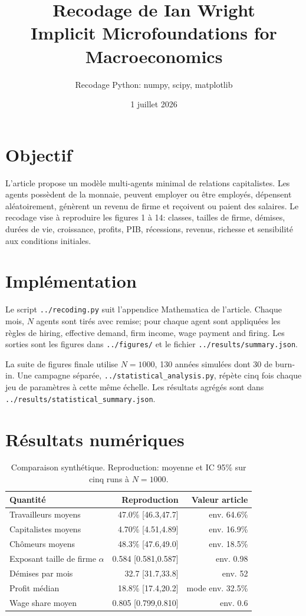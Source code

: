 \documentclass[11pt,a4paper]{article}
\title{Recodage de Ian Wright\\\large Implicit Microfoundations for Macroeconomics}
\author{Recodage Python: numpy, scipy, matplotlib}
\date{1 juillet 2026}
\begin{document}
\maketitle

\section{Objectif}

L'article propose un modèle multi-agents minimal de relations capitalistes. Les agents possèdent de la monnaie, peuvent employer ou être employés, dépensent aléatoirement, génèrent un revenu de firme et reçoivent ou paient des salaires. Le recodage vise à reproduire les figures 1 à 14: classes, tailles de firme, démises, durées de vie, croissance, profits, PIB, récessions, revenus, richesse et sensibilité aux conditions initiales.

\section{Implémentation}

Le script \texttt{../recoding.py} suit l'appendice Mathematica de l'article. Chaque mois, $N$ agents sont tirés avec remise; pour chaque agent sont appliquées les règles de hiring, effective demand, firm income, wage payment and firing. Les sorties sont les figures dans \texttt{../figures/} et le fichier \texttt{../results/summary.json}.

La suite de figures finale utilise $N=1000$, 130 années simulées dont 30 de burn-in. Une campagne séparée, \texttt{../statistical\_analysis.py}, répète cinq fois chaque jeu de paramètres à cette même échelle. Les résultats agrégés sont dans \texttt{../results/statistical\_summary.json}.

\section{Résultats numériques}

\begin{table}[h]
\centering
\begin{tabular}{lrr}
\toprule
Quantité & Reproduction & Valeur article \\
\midrule
Travailleurs moyens & 47.0\% [46.3,47.7] & env. 64.6\% \\
Capitalistes moyens & 4.70\% [4.51,4.89] & env. 16.9\% \\
Chômeurs moyens & 48.3\% [47.6,49.0] & env. 18.5\% \\
Exposant taille de firme $\alpha$ & 0.584 [0.581,0.587] & env. 0.98 \\
Démises par mois & 32.7 [31.7,33.8] & env. 52 \\
Profit médian & 18.8\% [17.4,20.2] & mode env. 32.5\% \\
Wage share moyen & 0.805 [0.799,0.810] & env. 0.6 \\
\bottomrule
\end{tabular}
\caption{Comparaison synthétique. Reproduction: moyenne et IC 95\% sur cinq runs à $N=1000$.}
\end{table}
\end{document}
